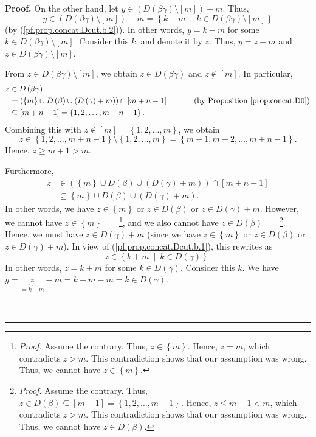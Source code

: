 \documentclass[numbers=enddot,12pt,final,onecolumn,notitlepage]{scrartcl}%
\theoremstyle{definition}
\newenvironment{proof}[1][Proof]{\noindent\textbf{#1.} }{\ \rule{0.5em}{0.5em}}
\begin{document}
\begin{proof}
On the other hand, let $y\in\left(  D\left(  \beta\gamma\right)
\setminus\left[  m\right]  \right)  -m$. Thus,
\[
y\in\left(  D\left(  \beta\gamma\right)  \setminus\left[  m\right]  \right)
-m=\left\{  k-m\ \mid\ k\in D\left(  \beta\gamma\right)  \setminus\left[
m\right]  \right\}
\]
(by (\ref{pf.prop.concat.Dcut.b.2})). In other words, $y=k-m$ for some $k\in
D\left(  \beta\gamma\right)  \setminus\left[  m\right]  $. Consider this $k$,
and denote it by $z$. Thus, $y=z-m$ and $z\in D\left(  \beta\gamma\right)
\setminus\left[  m\right]  $.

From $z\in D\left(  \beta\gamma\right)  \setminus\left[  m\right]  $, we
obtain $z\in D\left(  \beta\gamma\right)  $ and $z\notin\left[  m\right]  $.
In particular,%
\begin{align*}
z  &  \in D\left(  \beta\gamma\right) \\
&  =\left(  \left\{  m\right\}  \cup D\left(  \beta\right)  \cup\left(
D\left(  \gamma\right)  +m\right)  \right)  \cap\left[  m+n-1\right]
\ \ \ \ \ \ \ \ \ \ \left(  \text{by Proposition \ref{prop.concat.D0}}\right)
\\
&  \subseteq\left[  m+n-1\right]  =\left\{  1,2,\ldots,m+n-1\right\}  .
\end{align*}
Combining this with $z\notin\left[  m\right]  =\left\{  1,2,\ldots,m\right\}
$, we obtain%
\[
z\in\left\{  1,2,\ldots,m+n-1\right\}  \setminus\left\{  1,2,\ldots,m\right\}
=\left\{  m+1,m+2,\ldots,m+n-1\right\}  .
\]
Hence, $z\geq m+1>m$.

Furthermore,%
\begin{align*}
z  &  \in\left(  \left\{  m\right\}  \cup D\left(  \beta\right)  \cup\left(
D\left(  \gamma\right)  +m\right)  \right)  \cap\left[  m+n-1\right] \\
&  \subseteq\left\{  m\right\}  \cup D\left(  \beta\right)  \cup\left(
D\left(  \gamma\right)  +m\right)  .
\end{align*}
In other words, we have $z\in\left\{  m\right\}  $ or $z\in D\left(
\beta\right)  $ or $z\in D\left(  \gamma\right)  +m$. However, we cannot have
$z\in\left\{  m\right\}  $\ \ \ \ \footnote{\textit{Proof.} Assume the
contrary. Thus, $z\in\left\{  m\right\}  $. Hence, $z=m$, which contradicts
$z>m$. This contradiction shows that our assumption was wrong. Thus, we cannot
have $z\in\left\{  m\right\}  $.}, and we also cannot have $z\in D\left(
\beta\right)  $\ \ \ \ \footnote{\textit{Proof.} Assume the contrary. Thus,
$z\in D\left(  \beta\right)  \subseteq\left[  m-1\right]  =\left\{
1,2,\ldots,m-1\right\}  $. Hence, $z\leq m-1<m$, which contradicts $z>m$. This
contradiction shows that our assumption was wrong. Thus, we cannot have $z\in
D\left(  \beta\right)  $.}. Hence, we must have $z\in D\left(  \gamma\right)
+m$ (since we have $z\in\left\{  m\right\}  $ or $z\in D\left(  \beta\right)
$ or $z\in D\left(  \gamma\right)  +m$). In view of
(\ref{pf.prop.concat.Dcut.b.1}), this rewrites as
\[
z\in\left\{  k+m\ \mid\ k\in D\left(  \gamma\right)  \right\}  .
\]
In other words, $z=k+m$ for some $k\in D\left(  \gamma\right)  $. Consider
this $k$. We have $y=\underbrace{z}_{=k+m}-m=k+m-m=k\in D\left(
\gamma\right)  $.


\end{proof}
\end{document}
